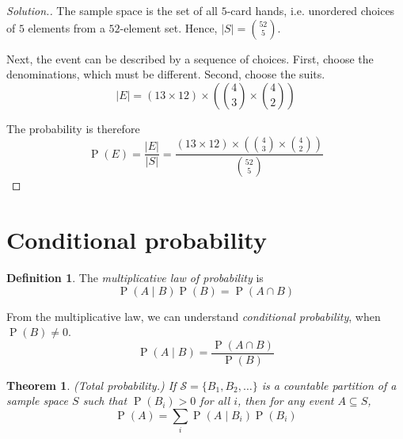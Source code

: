 \documentclass[11pt]{article}
\makeatletter
\newtheorem{thm}{Theorem}
\theoremstyle{definition}
\newtheorem{defn}{Definition}[section]
\theoremstyle{remark}
\newenvironment{solution}{
    \let\oldqedsymbol=\qedsymbol%
    \def\@addpunct##1{}%
    \renewcommand{\qedsymbol}{$\blacktriangleleft$}%
    \begin{proof}[\textit Solution.]
}{
    \end{proof}%
    \renewcommand{\qedsymbol}{\oldqedsymbol}
}
\newcommand{\parens}[1]{\left(#1\right)}
\newcommand{\intersn}{\cap}
\newcommand{\given}{\;\vert\;}
\DeclareMathOperator{\Prob}{P}
\renewcommand{\P}[1]{\Prob{\parens{#1}}}
\makeatother
\begin{document}
\begin{solution}
    The sample space is the set of all $5$-card hands, i.e. unordered choices
    of $5$ elements from a $52$-element set. Hence, $|S| = {52 \choose 5}$.

    Next, the event can be described by a sequence of choices. First, choose
    the denominations, which must be different. Second, choose the suits.
    \begin{equation*}
        |E| = (13 \times 12) \times \parens{{4 \choose 3} \times {4 \choose 2}}
    \end{equation*}

    The probability is therefore
    \begin{equation*}
        \P{E}
        = \frac{|E|}{|S|}
        = \frac{
            (13 \times 12) \times \parens{{4 \choose 3} \times {4 \choose 2}}
        }{
            {52 \choose 5}
        }
    \end{equation*}
\end{solution}

\section{Conditional probability}

\begin{defn}
    The \emph{multiplicative law of probability} is
    \begin{equation}
        \label{eq:multiplicative-law}
        \P{A \given B} \P{B} = \P{A \intersn B}
    \end{equation}

    From the multiplicative law, we can understand
    \emph{conditional probability}, when $\P{B} \neq 0$.
    \begin{equation}
        \label{eq:conditional-probability}
        \P{A \given B} = \frac{\P{A \intersn B}}{\P{B}}
    \end{equation}
\end{defn}

\begin{thm}{(Total probability.)}
    \label{thm:total-probability}
    If $\mathcal{S} = \{B_1, B_2, \ldots\}$ is a countable partition of a
    sample space $S$ such that $\P{B_i} > 0$ for all $i$, then for any event
    $A \subseteq S$,
    \begin{equation*}
        \P{A} = \sum_{i} \P{A \given B_i} \P{B_i}
    \end{equation*}
\end{thm}
\end{document}
